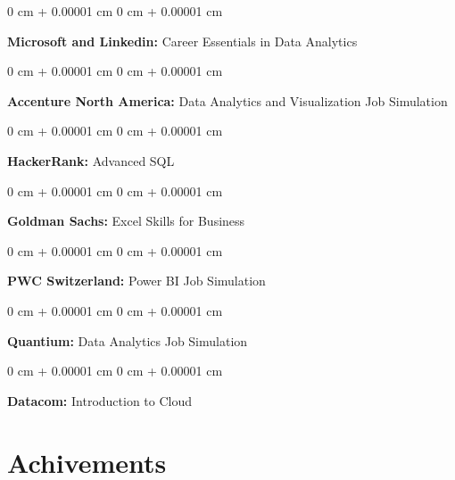 \documentclass[10pt, letterpaper]{article}
\newenvironment{onecolentry}{
    \begin{adjustwidth}{
        0 cm + 0.00001 cm
    }{
        0 cm + 0.00001 cm
    }
}{
    \end{adjustwidth}
} %
\begin{document}
          \begin{onecolentry}
            \textbf{Microsoft and Linkedin: }Career Essentials in Data Analytics
        \end{onecolentry}

\vspace{2 pt}

          \begin{onecolentry}
            \textbf{Accenture North America: }Data Analytics and Visualization Job Simulation
        \end{onecolentry}

        \vspace{2 pt}

          \begin{onecolentry}
            \textbf{HackerRank: }Advanced SQL
        \end{onecolentry}

        \vspace{2 pt}

          \begin{onecolentry}
            \textbf{Goldman Sachs: }Excel Skills for Business
        \end{onecolentry}

        \vspace{2 pt}

          \begin{onecolentry}
            \textbf{PWC Switzerland: }Power BI Job Simulation
        \end{onecolentry}

           \vspace{2 pt}

          \begin{onecolentry}
            \textbf{Quantium: }Data Analytics Job Simulation
        \end{onecolentry}

                \vspace{2 pt}

          \begin{onecolentry}
            \textbf{Datacom: }Introduction to Cloud
        \end{onecolentry}

        \vspace{5 pt}

        
\section{Achivements}
\end{document}
